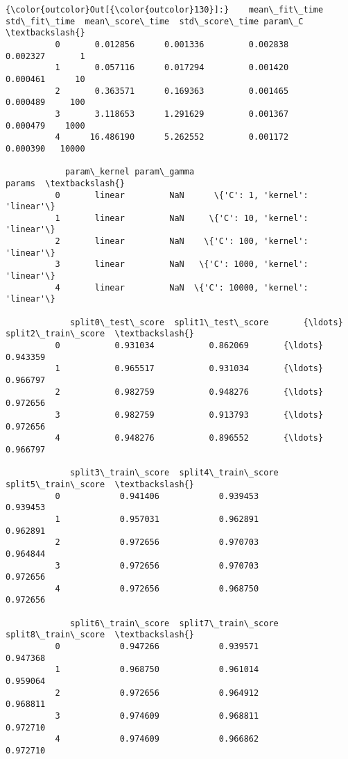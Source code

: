 \documentclass[11pt]{article}
\begin{document}
\begin{Verbatim}[commandchars=\\\{\}]
{\color{outcolor}Out[{\color{outcolor}130}]:}    mean\_fit\_time  std\_fit\_time  mean\_score\_time  std\_score\_time param\_C  \textbackslash{}
          0       0.012856      0.001336         0.002838        0.002327       1   
          1       0.057116      0.017294         0.001420        0.000461      10   
          2       0.363571      0.169363         0.001465        0.000489     100   
          3       3.118653      1.291629         0.001367        0.000479    1000   
          4      16.486190      5.262552         0.001172        0.000390   10000   
          
            param\_kernel param\_gamma                            params  \textbackslash{}
          0       linear         NaN      \{'C': 1, 'kernel': 'linear'\}   
          1       linear         NaN     \{'C': 10, 'kernel': 'linear'\}   
          2       linear         NaN    \{'C': 100, 'kernel': 'linear'\}   
          3       linear         NaN   \{'C': 1000, 'kernel': 'linear'\}   
          4       linear         NaN  \{'C': 10000, 'kernel': 'linear'\}   
          
             split0\_test\_score  split1\_test\_score       {\ldots}         split2\_train\_score  \textbackslash{}
          0           0.931034           0.862069       {\ldots}                   0.943359   
          1           0.965517           0.931034       {\ldots}                   0.966797   
          2           0.982759           0.948276       {\ldots}                   0.972656   
          3           0.982759           0.913793       {\ldots}                   0.972656   
          4           0.948276           0.896552       {\ldots}                   0.966797   
          
             split3\_train\_score  split4\_train\_score  split5\_train\_score  \textbackslash{}
          0            0.941406            0.939453            0.939453   
          1            0.957031            0.962891            0.962891   
          2            0.972656            0.970703            0.964844   
          3            0.972656            0.970703            0.972656   
          4            0.972656            0.968750            0.972656   
          
             split6\_train\_score  split7\_train\_score  split8\_train\_score  \textbackslash{}
          0            0.947266            0.939571            0.947368   
          1            0.968750            0.961014            0.959064   
          2            0.972656            0.964912            0.968811   
          3            0.974609            0.968811            0.972710   
          4            0.974609            0.966862            0.972710   
          

\end{Verbatim}
\end{document}
